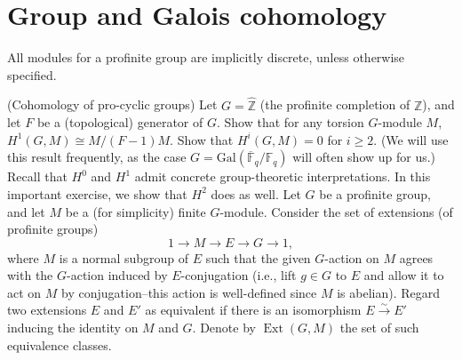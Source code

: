 \documentclass[11pt,answers,addpoints,reqno]{exam}
\theoremstyle{definition}
\theoremstyle{remark}
\theoremstyle{definition}
\theoremstyle{remark}
\theoremstyle{remark}
\newcommand{\Z}{\mathbb{Z}}
\DeclareMathOperator{\Ext}{Ext}
\newcommand{\Gal}{\mathrm{Gal}} %
\begin{document}
\section{Group and Galois cohomology}
All modules for a profinite group are implicitly discrete, unless otherwise specified.
\begin{questions}
\question (Cohomology of pro-cyclic groups) Let $G= \widehat{\Z}$ (the profinite
completion of $\Z$), and let $F$ be a (topological) generator of $G$. Show that for any torsion $G$-module $M$, $H^1(G, M) \cong M/(F-1)M$. Show that $H^i(G, M)=0$ for $i \geq 2$. (We will use this result frequently, as the case $G= \Gal(\overline{\mathbb{F}}_q/\mathbb{F}_q)$ will often show up for us.)
\question Recall that $H^0$ and $H^1$ admit concrete group-theoretic
interpretations. In this important exercise, we show that $H^2$ does as well. Let $G$ be a profinite group, and let $M$ be a (for simplicity) finite $G$-module. Consider the set of extensions (of profinite groups)
\[
 1 \to M \to E \to G \to 1,
\]
where $M$ is a normal subgroup of $E$ such that the given $G$-action on $M$ agrees with the $G$-action induced by $E$-conjugation (i.e., lift $g\in G$ to $E$ and allow it to act on $M$ by conjugation--this action is well-defined since $M$ is abelian). Regard two extensions $E$ and $E'$ as equivalent if there is an isomorphism $E \xrightarrow{\sim} E'$ inducing the identity on $M$ and $G$. Denote by $\Ext(G, M)$ the set of such equivalence classes.
\end{questions}
\end{document}
